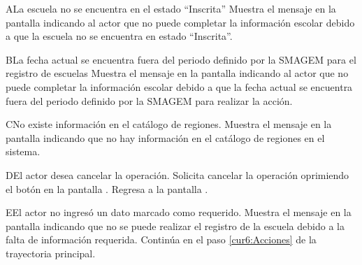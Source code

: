 
 \begin{UCtrayectoriaA}{A}{La escuela no se encuentra en el estado ``Inscrita''}
    \UCpaso[\UCsist] Muestra el mensaje  en la pantalla  indicando al actor que no puede completar la información escolar debido a que la escuela no se encuentra en estado ``Inscrita''.
 \end{UCtrayectoriaA}

 \begin{UCtrayectoriaA}{B}{La fecha actual se encuentra fuera del periodo definido por la SMAGEM para el registro de escuelas}
    \UCpaso[\UCsist] Muestra el mensaje  en la pantalla  indicando al actor que no puede completar la información escolar debido a que la fecha actual se encuentra fuera del periodo definido por la SMAGEM para realizar la acción.
 \end{UCtrayectoriaA}

  \begin{UCtrayectoriaA}{C}{No existe información en el catálogo de regiones.}
    \UCpaso[\UCsist] Muestra el mensaje  en la pantalla  indicando que no hay información en el catálogo de regiones en el sistema.
  \end{UCtrayectoriaA}

 \begin{UCtrayectoriaA}{D}{El actor desea cancelar la operación.}
    \UCpaso[\UCactor] Solicita cancelar la operación oprimiendo el botón  en la pantalla .
    \UCpaso[\UCsist] Regresa a la pantalla .
 \end{UCtrayectoriaA}

 \begin{UCtrayectoriaA}{E}{El actor no ingresó un dato marcado como requerido.}
    \UCpaso[\UCsist] Muestra el mensaje  en la pantalla  indicando que no se puede realizar el registro de la escuela debido a la falta de información requerida.
   \UCpaso[] Continúa en el paso \ref{cur6:Acciones} de la trayectoria principal.
 \end{UCtrayectoriaA}

